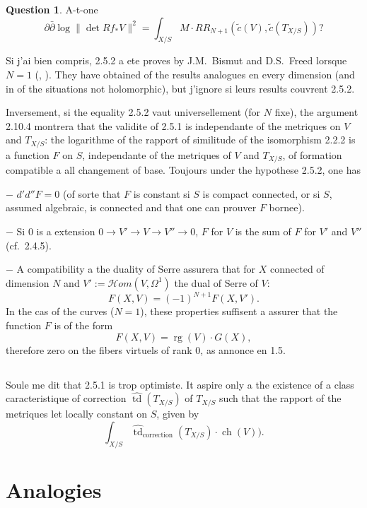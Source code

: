 \documentclass[12pt,a4paper]{article}
\theoremstyle{plain}
\theoremstyle{definition}
\newtheorem{question}[theorem]{Question}
\DeclareMathOperator{\rank}{rg}
\DeclareMathOperator{\ch}{ch}
\DeclareMathOperator{\td}{td}
\begin{document}
\begin{question}
A-t-one
\[
\partial \bar\partial \log \|\det Rf_* V\|^2 = \textstyle \int_{X/S} M \cdot RR_{N+1}(\tilde{c}(V), \tilde{c}(T_{X/S}))?
\]
\end{question}

Si j'ai bien compris, 2.5.2 a ete proves by J.M.~Bismut and D.S.~Freed lorsque
$N = 1$ (\cite{3}, \cite{6}). They have obtained of the results analogues en every dimension (and in of the situations
not holomorphic), but j'ignore si leurs results couvrent 2.5.2.

Inversement, si the equality 2.5.2 vaut universellement (for $N$ fixe), the argument
2.10.4 montrera that the validite of 2.5.1 is independante of the metriques on $V$ and
$T_{X/S}$: the logarithme of the rapport of similitude of the isomorphism 2.2.2 is a
function $F$ on $S$, independante of the metriques of $V$ and $T_{X/S}$, of formation
compatible a all changement of base. Toujours under the hypothese 2.5.2, one has

$-$ $d'd''F = 0$ (of sorte that $F$ is constant si $S$ is compact connected,
or si $S$, assumed algebraic, is connected and that one can prouver $F$ bornee).

$-$ Si $0$ is a extension $0 \to V' \to V \to V'' \to 0$, $F$ for $V$ is the sum
of $F$ for $V'$ and $V''$ (cf.~2.4.5).

$-$ A compatibility a the duality of Serre assurera that for $X$ connected of dimension
$N$ and $V' := \mathscr{H}om(V, \Omega^1)$ the dual of Serre of $V$:
\[
F(X,V) = (-1)^{N+1} F(X,V') .
\]
In the cas of the curves ($N=1$), these properties suffisent a assurer that the function
$F$ is of the form
\[
F(X,V) = \rank(V) \cdot G(X) ,
\]
therefore zero on the fibers virtuels of rank 0, as annonce en 1.5.

\subsection{}

Soule me dit that 2.5.1 is trop optimiste. It aspire only a the existence
of a class caracteristique of correction $\widehat{\td}(T_{X/S})$ of $T_{X/S}$ such that the rapport
of the metriques let locally constant on $S$, given by
\[
\textstyle \int_{X/S} \widehat{\td}_{\text{correction}}(T_{X/S}) \cdot \ch(V)) .
\]



\section{Analogies}
\end{document}
